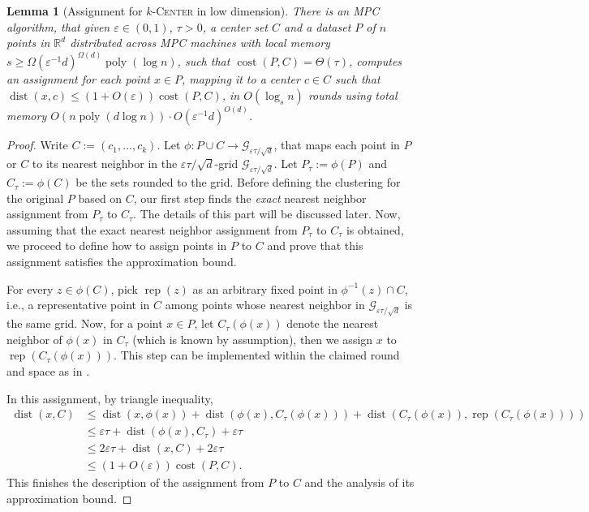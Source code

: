 \documentclass[11pt,letterpaper]{article}
\theoremstyle{plain}
\newtheorem{lemma}[theorem]{Lemma}
\theoremstyle{definition}
\theoremstyle{remark}
\newcommand{\ProblemName}[1]{\textsc{#1}}
\newcommand{\kCenter}{$k$-\ProblemName{Center}\xspace}
\DeclareMathOperator{\poly}{poly}
\DeclareMathOperator{\cost}{cost}
\DeclareMathOperator{\dist}{dist}
\DeclareMathOperator*{\rep}{rep}
\renewcommand{\epsilon}{\ensuremath{\varepsilon}}
\let\epsilon\varepsilon
\begin{document}
\begin{lemma}[Assignment for \kCenter in low dimension]
    \label{lemma:assignment_low_dim}
    There is an MPC algorithm, that given $\varepsilon\in (0, 1)$, $\tau > 0$,
    a center set $C$ and a dataset $P$ of $n$ points in $\mathbb{R}^{d}$ distributed across MPC machines with local memory $s\geq \Omega(\varepsilon^{-1}d)^{\Omega(d)}\poly(\log n)$, such that $\cost(P, C) = \Theta(\tau)$, computes an assignment for each point $x\in P$, mapping it to a center $c\in C$ such that $\dist(x, c)\leq (1 + O(\varepsilon))\cost(P, C)$, in $O(\log_{s}n)$ rounds using total memory $O(n\poly(d\log n))\cdot O(\varepsilon^{-1}d)^{O(d)}$. 
\end{lemma}
\begin{proof}
    Write $C := (c_{1}, \ldots, c_{k})$. 
Let $\phi : P \cup C \to \mathcal{G}_{\epsilon \tau / \sqrt{d}}$,
    that maps each point in $P$ or $C$ to its nearest neighbor in the $\epsilon \tau / \sqrt d$-grid $\mathcal{G}_{\epsilon \tau / \sqrt d}$.
    Let $P_{\tau} := \phi(P)$ and $C_{\tau} := \phi(C)$ be the sets rounded to the grid.
Before defining the clustering for the original $P$ based on $C$, 
    our first step finds the \emph{exact} nearest neighbor assignment from $P_{\tau}$ to $C_{\tau}$.
    The details of this part will be discussed later. 
    Now, assuming that the exact nearest neighbor assignment from $P_{\tau}$ to $C_{\tau}$ is obtained,
    we proceed to define how to assign points in $P$ to $C$ and prove that this assignment satisfies the approximation bound.
    
    For every $z \in \phi(C)$, pick $\rep(z)$  as an arbitrary fixed point in $\phi^{-1}(z) \cap C$, i.e., a representative point in $C$ among points whose nearest neighbor in $\mathcal{G}_{\epsilon \tau / \sqrt d}$ is the same grid.
    Now, for a point $x \in P$,
let $C_\tau(\phi(x))$ denote the nearest neighbor of $\phi(x)$ in $C_{\tau}$ (which is known by assumption),
    then we assign $x$ to $\rep( C_\tau(\phi(x)) )$.
    This step can be implemented within the claimed round and space as in .


    In this assignment, by triangle inequality,
    \begin{align*}
        \dist(x, C)
        &\leq \dist(x, \phi(x)) + \dist(\phi(x), C_\tau(\phi(x))) + \dist(C_\tau(\phi(x)), \rep(C_\tau(\phi(x)))) \\
        &\leq \varepsilon\tau + \dist(\phi(x), C_{\tau}) + \varepsilon\tau \\
        &\leq 2\epsilon \tau + \dist(x, C) + 2\epsilon \tau \\
        &\leq (1+O(\varepsilon))\cost(P, C).
    \end{align*}
    This finishes the description of the assignment from $P$ to $C$ and the analysis of its approximation bound. 



\end{proof}
\end{document}
